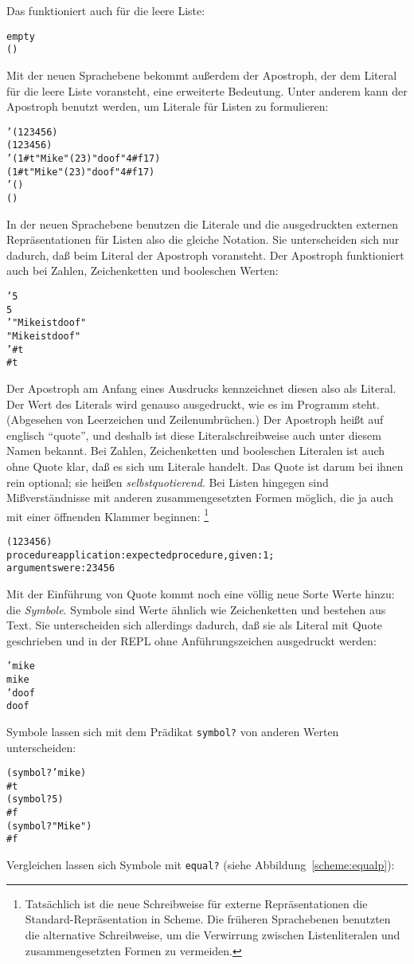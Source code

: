 Das funktioniert auch für die leere Liste:
%
\begin{alltt}
empty
\evalsto{} ()
\end{alltt}
%
Mit der neuen Sprachebene bekommt außerdem der Apostroph, der dem
Literal für die leere Liste voransteht, eine erweiterte Bedeutung.
Unter anderem kann der Apostroph benutzt werden, um Literale für
Listen zu formulieren:
%
\begin{alltt}
'(1 2 3 4 5 6)
\evalsto{} (1 2 3 4 5 6)
'(1 #t "Mike" (2 3) "doof" 4 #f 17)
\evalsto{} (1 #t "Mike" (2 3) "doof" 4 #f 17)
'()
\evalsto{} ()
\end{alltt}
%
In der neuen Sprachebene benutzen die Literale und die ausgedruckten
externen Repräsentationen für Listen also die gleiche
Notation.  Sie unterscheiden sich nur dadurch,
daß beim Literal der Apostroph voransteht.  Der Apostroph funktioniert
auch bei Zahlen, Zeichenketten und booleschen Werten:
%
\begin{alltt}
'5
\evalsto{} 5
'"Mike ist doof"
\evalsto{} "Mike ist doof"
'#t
\evalsto{} #t
\end{alltt}
%
Der Apostroph am Anfang eines Ausdrucks
kennzeichnet diesen also als Literal.  Der Wert des Literals wird 
genauso ausgedruckt, wie es im Programm steht.  (Abgesehen von
Leerzeichen und Zeilenumbrüchen.)  Der Apostroph heißt auf englisch
"`quote"', und deshalb ist diese
Literalschreibweise auch unter diesem Namen bekannt.  Bei Zahlen,
Zeichenketten und booleschen Literalen ist auch ohne Quote klar, daß
es sich um Literale handelt.  Das Quote ist darum bei ihnen rein
optional; sie heißen 
\textit{selbstquotierend}.
Bei Listen hingegen sind Mißverständnisse mit anderen
zusammengesetzten Formen möglich, die ja auch mit einer öffnenden Klammer
beginnen: \footnote{Tatsächlich ist die neue Schreibweise für externe
  Repräsentationen die Standard-Repräsentation in Scheme.  Die
  früheren Sprachebenen benutzten die alternative Schreibweise, um die
  Verwirrung zwischen Listenliteralen und zusammengesetzten Formen zu
  vermeiden.}
\begin{alltt}
(1 2 3 4 5 6)
\evalsto{} procedure application: expected procedure, given: 1;
     arguments were: 2 3 4 5 6
\end{alltt}
%
Mit der Einführung von Quote kommt noch eine völlig neue Sorte Werte
hinzu: die \textit{Symbole}.  Symbole sind Werte ähnlich wie Zeichenketten und
bestehen aus Text.  Sie unterscheiden sich allerdings dadurch, daß sie
als Literal mit Quote geschrieben und in der REPL ohne
Anführungszeichen ausgedruckt werden:
%
\begin{alltt}
'mike
\evalsto{} mike
'doof
\evalsto{} doof
\end{alltt}
%
Symbole lassen sich mit dem Prädikat
\texttt{symbol?} von anderen Werten
unterscheiden:
%
\begin{alltt}
(symbol? 'mike)
\evalsto{} #t
(symbol? 5)
\evalsto{} #f
(symbol? "Mike")
\evalsto{} #f
\end{alltt}
%
Vergleichen lassen sich Symbole mit \texttt{equal?} (siehe
Abbildung~\ref{scheme:equalp}):

